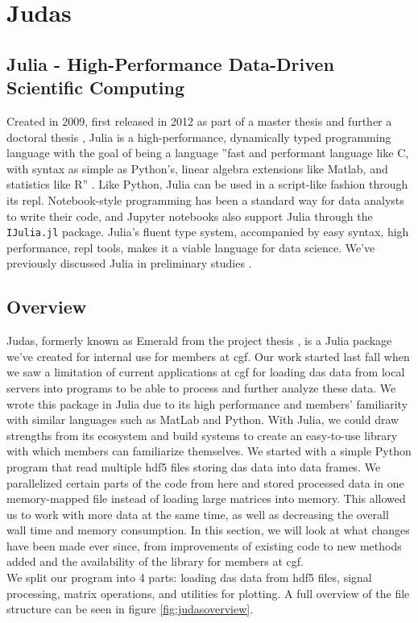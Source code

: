 \section{Judas}
\label{met:Judas}

\subsection{Julia - High-Performance Data-Driven Scientific Computing}
\label{met:Julia}

Created in 2009, first released in 2012 as part of a master thesis \cite{juliaMs} and further a doctoral thesis \cite{juliaPHD}, Julia is a high-performance, dynamically typed programming language with the goal of being a language ''fast and performant language like C, with syntax as simple as Python's, linear algebra extensions like Matlab, and statistics like R'' \cite{julia}. Like Python, Julia can be used in a script-like fashion through its \acrfull{repl}. Notebook-style programming has been a standard way for data analysts to write their code, and Jupyter notebooks also support Julia through the \texttt{IJulia.jl} package. Julia's fluent type system, accompanied by easy syntax, high performance, \acrshort{repl} tools, makes it a viable language for data science. We've previously discussed Julia in preliminary studies \cite{projthesis}.

\subsection{Overview}
\label{met:judasoverview}

Judas, formerly known as Emerald from the project thesis \cite{projthesis}, is a Julia package we've created for internal use for members at \acrshort{cgf}. Our work started last fall when we saw a limitation of current applications at \acrshort{cgf} for loading \acrshort{das} data from local servers into programs to be able to process and further analyze these data. We wrote this package in Julia due to its high performance and members' familiarity with similar languages such as MatLab and Python. With Julia, we could draw strengths from its ecosystem and build systems to create an easy-to-use library with which members can familiarize themselves. We started with a simple Python program that read multiple \acrshort{hdf5} files storing \acrshort{das} data into data frames. We parallelized certain parts of the code from here and stored processed data in one memory-mapped file instead of loading large matrices into memory. This allowed us to work with more data at the same time, as well as decreasing the overall wall time and memory consumption.  
In this section, we will look at what changes have been made ever since, from improvements of existing code to new methods added and the availability of the library for members at \acrshort{cgf}. \\
We split our program into 4 parts: loading \acrshort{das} data from \acrshort{hdf5} files, signal processing, matrix operations, and utilities for plotting. A full overview of the file structure can be seen in figure \ref{fig:judasoverview}.\\

